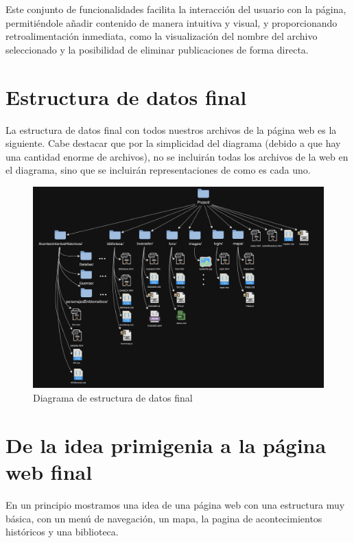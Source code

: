 \documentclass{article}
\begin{document}
Este conjunto de funcionalidades facilita la interacción del usuario con la página, permitiéndole añadir contenido de manera intuitiva y visual, y proporcionando retroalimentación inmediata, como la visualización del nombre del archivo seleccionado y la posibilidad de eliminar publicaciones de forma directa. 

\newpage

\section{Estructura de datos final}

La estructura de datos final con todos nuestros archivos de la página web es la siguiente. Cabe destacar que por la simplicidad del diagrama (debido a que hay una cantidad enorme de archivos), no se incluirán todas los archivos de la web en el diagrama, sino que se incluirán representaciones de como es cada uno.

\begin{figure}[H]
    \centering
    \includegraphics[width=1\textwidth]{jsFotos/estructuraDatosFinal.jpg}
    \caption{Diagrama de estructura de datos final}
    \label{fig:foro_interface}
\end{figure}

\newpage

\section{De la idea primigenia a la página web final}

En un principio mostramos una idea de una página web con una estructura muy básica, con un menú de navegación, un mapa, la pagina de acontecimientos históricos y una biblioteca. 
\end{document}
